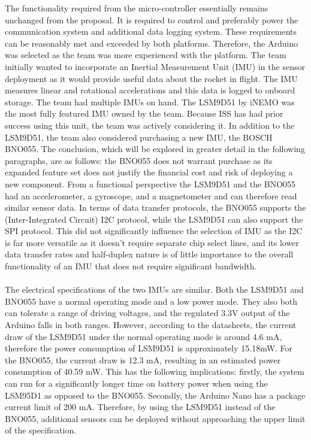 	The functionality required from the micro-controller essentially remains unchanged from the proposal. It is required to control and preferably power the communication system and additional data logging system. These requirements can be reasonably met and exceeded by both platforms. Therefore, the Arduino was selected as the team was more experienced with the platform. 
The team initially wanted to incorporate an Inertial Measurement Unit (IMU) in the sensor deployment as it would provide useful data about the rocket in flight. The IMU measures linear and rotational accelerations and this data is logged to onboard storage. The team had multiple IMUs on hand. The LSM9D51 by iNEMO was the most fully featured IMU owned by the team. Because ISS has had prior success using this unit,  the team was actively considering it. In addition to the LSM9D51, the team also considered purchasing a new IMU, the BOSCH BNO055. The conclusion, which will be explored in greater detail in the following paragraphs, are as follows: the BNO055 does not warrant purchase as its expanded feature set does not justify the financial cost and risk of deploying a new component.  
From a functional perspective the LSM9D51 and the BNO055 had an accelerometer, a gyroscope, and a magnetometer and can therefore read similar sensor data. In terms of data transfer protocols, the BNO055 supports the (Inter-Integrated Circuit) I2C protocol, while the LSM9D51 can also support the SPI protocol. This did not significantly influence the selection of IMU as the I2C is far more versatile as it doesn’t require separate chip select lines, and its lower data transfer rates and half-duplex nature is of little importance to the overall functionality of an IMU that does not require significant bandwidth.\\\\
The electrical specifications of the two IMUs are similar. Both the LSM9D51 and BNO055 have a normal operating mode and a low power mode. They also both can tolerate a range of driving voltages, and the regulated 3.3V output of the Arduino falls in both ranges. However, according to the datasheets, the current draw of the LSM9D51 under the normal operating mode is around 4.6 mA, therefore the power consumption of LSM9D51 is approximately 15.18mW. For the BNO055, the current draw is 12.3 mA, resulting in an estimated power consumption of 40.59 mW. This has the following implications: firstly, the system can run for a significantly longer time on battery power when using the LSM95D1 as opposed to the BNO055. Secondly, the Arduino Nano has a package current limit of 200 mA. Therefore, by using the LSM9D51 instead of the BNO055, additional sensors can be deployed without approaching the upper limit of the specification. 	

